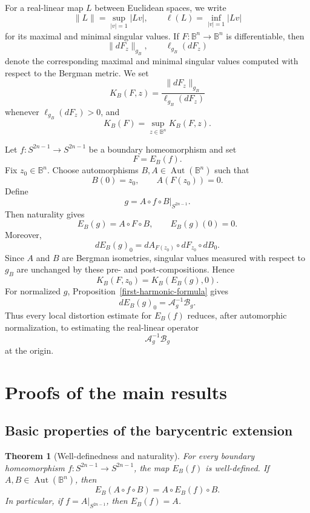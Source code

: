 \documentclass[11pt]{article}
\newtheorem{theorem}{Theorem}[section]
\theoremstyle{definition}
\theoremstyle{remark}
\theoremstyle{definition}
\newcommand{\B}{\mathbb B}
\newcommand{\Aut}{\operatorname{Aut}}
\begin{document}
For a real-linear map \(L\) between Euclidean spaces, we write
\[
        \|L\|=\sup_{|v|=1}|Lv|,
        \qquad
        \ell(L)=\inf_{|v|=1}|Lv|
\]
for its maximal and minimal singular values.  If \(F:\B^n\to\B^n\) is
differentiable, then
\[
        \|dF_z\|_{g_B},
        \qquad
        \ell_{g_B}(dF_z)
\]
denote the corresponding maximal and minimal singular values computed with
respect to the Bergman metric.  We set
\[
        K_B(F,z)=
        \frac{\|dF_z\|_{g_B}}{\ell_{g_B}(dF_z)}
\]
whenever \(\ell_{g_B}(dF_z)>0\), and
\[
        K_B(F)=\sup_{z\in\B^n}K_B(F,z).
\]

Let \(f:S^{2n-1}\to S^{2n-1}\) be a boundary homeomorphism and set
\[
        F=E_B(f).
\]
Fix \(z_0\in\B^n\).  Choose automorphisms \(B,A\in\Aut(\B^n)\) such that
\[
        B(0)=z_0,
        \qquad
        A(F(z_0))=0.
\]
Define
\[
        g=A\circ f\circ B|_{S^{2n-1}}.
\]
Then naturality gives
\[
        E_B(g)=A\circ F\circ B,
        \qquad
        E_B(g)(0)=0.
\]
Moreover,
\[
        dE_B(g)_0
        =
        dA_{F(z_0)}
        \circ
        dF_{z_0}
        \circ
        dB_0.
\]
Since \(A\) and \(B\) are Bergman isometries, singular values measured with
respect to \(g_B\) are unchanged by these pre- and post-compositions.  Hence
\[
        K_B(F,z_0)=K_B(E_B(g),0).
\]
For normalized \(g\), Proposition~\ref{first-harmonic-formula} gives
\[
        dE_B(g)_0=\mathcal A_g^{-1}\mathcal B_g.
\]
Thus every local distortion estimate for \(E_B(f)\) reduces, after
automorphic normalization, to estimating the real-linear operator
\[
        \mathcal A_g^{-1}\mathcal B_g
\]
at the origin.


\section{Proofs of the main results}
\label{section-main-proofs}

\subsection{Basic properties of the barycentric extension}

\begin{theorem}[Well-definedness and naturality]\label{naturality-theorem}
For every boundary homeomorphism \(f:S^{2n-1}\to S^{2n-1}\), the map
\(E_B(f)\) is well-defined.  If \(A,B\in\Aut(\B^n)\), then
\begin{equation}\label{naturality-equation}
        E_B(A\circ f\circ B)=A\circ E_B(f)\circ B.
\end{equation}
In particular, if \(f=A|_{S^{2n-1}}\), then \(E_B(f)=A\).
\end{theorem}
\end{document}
